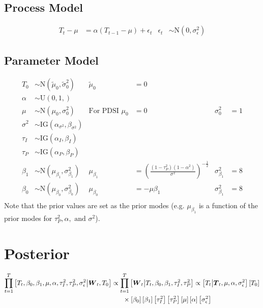 \documentclass{article}\usepackage[]{graphicx}\usepackage[]{color}
\def\bm#1{\mbox{\boldmath $#1$}}
\begin{document}
\subsection{Process Model}
%
\begin{align*}
%
T_t - \mu & = \alpha \left( T_{t - 1} - \mu \right) + \epsilon_t  & \epsilon_t & \sim \mbox{N}(0, \sigma^2_\epsilon)
%
\end{align*}
%
%
%
\subsection{Parameter Model}
%
\begin{align*}
%
T_0 & \sim \mbox{N}\left( \tilde{\mu}_0, \tilde{\sigma}^2_0 \right) & \tilde{\mu}_0 & = 0 \\
%
\alpha & \sim \mbox{U}\left( 0, 1, \right)\\
%
\mu & \sim \mbox{N} \left( \mu_0, \sigma^2_0 \right) & \mbox{For PDSI } \mu_0 & = 0 & \sigma^2_0 & = 1 \\
%
\sigma^2 & \sim \mbox{IG}\left( \alpha_{\sigma^2}, \beta_{\sigma^2} \right)\\
%
\tau_I & \sim \mbox{IG}\left( \alpha_I, \beta_I \right)\\
%
\tau_P & \sim \mbox{IG}\left( \alpha_P, \beta_P \right)\\
%
\beta_1 & \sim \mbox{N} \left( \mu_{\beta_1}, \sigma^2_{\beta_1} \right) & \mu_{\beta_1} & = \left( \frac{(1 - \tau_P^2) (1 - \alpha^2)} {\sigma^2} \right)^{ - \frac{1} {2} } & \sigma^2_{\beta_1} & = 8 \\
%
\beta_0 & \sim \mbox{N} \left( \mu_{\beta_0}, \sigma^2_{\beta_0} \right) & \mu_{\beta_0} & = - \mu \beta_1 & \sigma^2_{\beta_1} & = 8 \\
%
\end{align*}
%
Note that the prior values are set as the prior modes (e.g. $\mu_{\beta_1}$ is a function of the prior modes for $\tau^2_P, \alpha, \mbox{ and } \sigma^2$).
%
%
\section{Posterior}
%
\begin{align*}
%
\prod_{t = 1}^T \left[ T_t, \beta_0, \beta_1, \mu, \alpha, \tau^2_I, \tau^2_P, \sigma^2_\epsilon \middle| \bm{W}_t, T_0 \right] & \propto \prod_{t = 1}^T \left[ \bm{W}_t \middle| T_t, \beta_0, \beta_1, \tau^2_I, \tau^2_P \right] \propto \left[ T_t \middle| \bm{T}_t, \mu, \alpha, \sigma^2_\epsilon \right] \left[ T_0 \right] \\ 
& \hspace{6mm} \times \left[ \beta_0 \right] \left[ \beta_1 \right] \left[ \tau^2_I \right] \left[ \tau^2_P \right] \left[ \mu \right] \left[ \alpha \right] \left[ \sigma^2_\epsilon \right] 
%
\end{align*}
%
%
\end{document}
